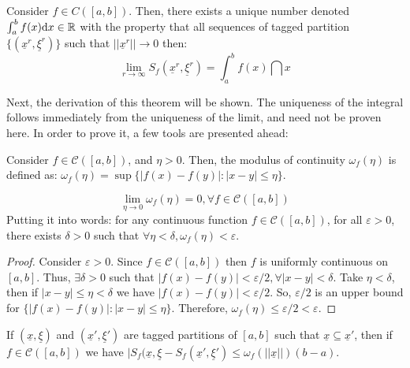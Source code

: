 \newpage

\begin{theorem}
    Consider $f \in C([a,b])$. Then, there exists a unique number denoted $\int_{a}^b f(x)\text{d} x \in \mathbb{R}$ with the property that all sequences of tagged partition $\{(\underline{x}^r, \underline{\xi}^r)\}$ such that $||\underline{x}^r|| \to 0$ then:
    \begin{equation}
        \lim \limits_{r \to \infty} S_f(\underline{x}^r, \underline{\xi}^r) = \int_{a}^b f(x) \dint x
    \end{equation}
\end{theorem}

Next, the derivation of this theorem will be shown. The uniqueness of the integral follows immediately from the uniqueness of the limit, and need not be proven here. In order to prove it, a few tools are presented ahead:

\begin{definition}
    Consider $f \in \mathcal{C}([a,b])$, and $\eta >0$. Then, the modulus of continuity $\omega_f(\eta)$ is defined as: $\omega_f(\eta) = \sup \{|f(x) - f(y)|:|x-y| \leq \eta\}$.
\end{definition}

\begin{theorem}[Theorem I]
    \begin{equation}
        \lim \limits_{\eta \to 0} \omega_f(\eta) = 0, \forall f \in \mathcal{C}([a,b])
    \end{equation}
    Putting it into words: for any continuous function $f \in \mathcal{C}([a,b])$, for all $\varepsilon > 0$, there exists $\delta > 0$ such that $\forall \eta < \delta, \omega_f(\eta)<\varepsilon$.
\end{theorem}

\begin{proof}
    Consider $\varepsilon > 0$. Since $f \in \mathcal{C}([a,b])$ then $f$ is uniformly continuous on $[a,b]$. Thus, $\exists \delta > 0$ such that $|f(x) - f(y)| < \varepsilon/2, \forall |x-y| < \delta$. Take $\eta < \delta$, then if $|x-y| \leq \eta < \delta$ we have $|f(x) - f(y)| < \varepsilon/2$. So, $\varepsilon/2$ is an upper bound for $\{|f(x) - f(y)|:|x-y|\leq \eta\}$. Therefore, $\omega_f(\eta) \leq \varepsilon/2 < \varepsilon$.
\end{proof}

\begin{theorem}[Theorem II]
    If $(\underline{x}, \underline{\xi})$ and $(\underline{x}', \underline{\xi}')$ are tagged partitions of $[a,b]$ such that $\underline{x} \subseteq \underline{x}'$, then if $f \in \mathcal{C}([a,b])$ we have $|S_f(\underline{x}, \underline{\xi} - S_f(\underline{x}', \underline{\xi}') \leq \omega_f(||\underline{x}||)(b-a)$.
\end{theorem}

